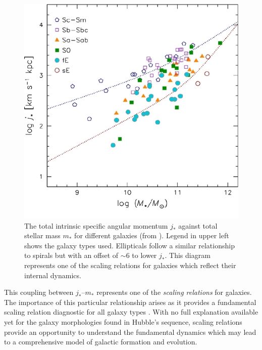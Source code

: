 \documentclass[12pt, twocolumn]{revtex4-1}    %
\begin{document}
\begin{figure}
\includegraphics[width=1.0\linewidth]{introduction/romanowsky_2012_fig_3}
\captionsetup{justification=raggedright}
\caption{The total intrinsic specific angular momentum $j_*$ against total stellar mass $m_*$ for different galaxies (from \citealt{2012ApJS..203...17R}). Legend in upper left shows the galaxy types used. Ellipticals follow a similar relationship to spirals but with an offset of $\sim6$ to lower $j_*$. This diagram represents one of the scaling relations for galaxies which reflect their internal dynamics.}
\label{fig:romanowsky_fall_2012}
\end{figure}

This coupling between $j_*$--$m_*$ represents one of the \textit{scaling relations} for galaxies. The importance of this particular relationship arises as it provides a fundamental scaling relation diagnostic for all galaxy types \citep{2012ApJS..203...17R}. With no full explanation available yet for the galaxy morphologies found in Hubble's sequence, scaling relations provide an opportunity to understand the fundamental dynamics which may lead to a comprehensive model of galactic formation and evolution.

\end{document}
